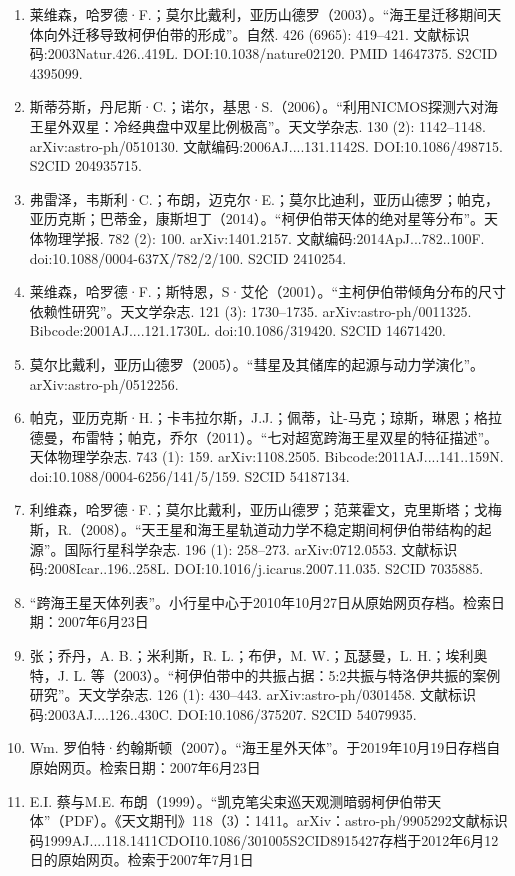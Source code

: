 \begin{enumerate}
\item 莱维森，哈罗德·F.；莫尔比戴利，亚历山德罗（2003）。“海王星迁移期间天体向外迁移导致柯伊伯带的形成”。自然. 426 (6965): 419–421. 文献标识码:2003Natur.426..419L. DOI:10.1038/nature02120. PMID 14647375. S2CID 4395099.
\item 斯蒂芬斯，丹尼斯·C.；诺尔，基思·S.（2006）。“利用NICMOS探测六对海王星外双星：冷经典盘中双星比例极高”。天文学杂志. 130 (2): 1142–1148. arXiv:astro-ph/0510130. 文献编码:2006AJ....131.1142S. DOI:10.1086/498715. S2CID 204935715.
\item 弗雷泽，韦斯利·C.；布朗，迈克尔·E.；莫尔比迪利，亚历山德罗；帕克，亚历克斯；巴蒂金，康斯坦丁（2014）。“柯伊伯带天体的绝对星等分布”。天体物理学报. 782 (2): 100. arXiv:1401.2157. 文献编码:2014ApJ...782..100F. doi:10.1088/0004-637X/782/2/100. S2CID 2410254.
\item 莱维森，哈罗德·F.；斯特恩，S·艾伦（2001）。“主柯伊伯带倾角分布的尺寸依赖性研究”。天文学杂志. 121 (3): 1730–1735. arXiv:astro-ph/0011325. Bibcode:2001AJ....121.1730L. doi:10.1086/319420. S2CID 14671420.
\item 莫尔比戴利，亚历山德罗（2005）。“彗星及其储库的起源与动力学演化”。arXiv:astro-ph/0512256.
\item 帕克，亚历克斯·H.；卡韦拉尔斯，J.J.；佩蒂，让-马克；琼斯，琳恩；格拉德曼，布雷特；帕克，乔尔（2011）。“七对超宽跨海王星双星的特征描述”。天体物理学杂志. 743 (1): 159. arXiv:1108.2505. Bibcode:2011AJ....141..159N. doi:10.1088/0004-6256/141/5/159. S2CID 54187134.
\item 利维森，哈罗德·F.；莫尔比戴利，亚历山德罗；范莱霍文，克里斯塔；戈梅斯，R.（2008）。“天王星和海王星轨道动力学不稳定期间柯伊伯带结构的起源”。国际行星科学杂志. 196 (1): 258–273. arXiv:0712.0553. 文献标识码:2008Icar..196..258L. DOI:10.1016/j.icarus.2007.11.035. S2CID 7035885.
\item “跨海王星天体列表”。小行星中心于2010年10月27日从原始网页存档。检索日期：2007年6月23日
\item 张；乔丹，A. B.；米利斯，R. L.；布伊，M. W.；瓦瑟曼，L. H.；埃利奥特，J. L. 等（2003）。“柯伊伯带中的共振占据：5:2共振与特洛伊共振的案例研究”。天文学杂志. 126 (1): 430–443. arXiv:astro-ph/0301458. 文献标识码:2003AJ....126..430C. DOI:10.1086/375207. S2CID 54079935.
\item Wm. 罗伯特·约翰斯顿（2007）。“海王星外天体”。于2019年10月19日存档自原始网页。检索日期：2007年6月23日
\item E.I. 蔡与M.E. 布朗（1999）。“凯克笔尖束巡天观测暗弱柯伊伯带天体”（PDF）。《天文期刊》118（3）：1411。arXiv：astro-ph/9905292文献标识码1999AJ....118.1411CDOI10.1086/301005S2CID8915427存档于2012年6月12日的原始网页。检索于2007年7月1日

\end{enumerate}
